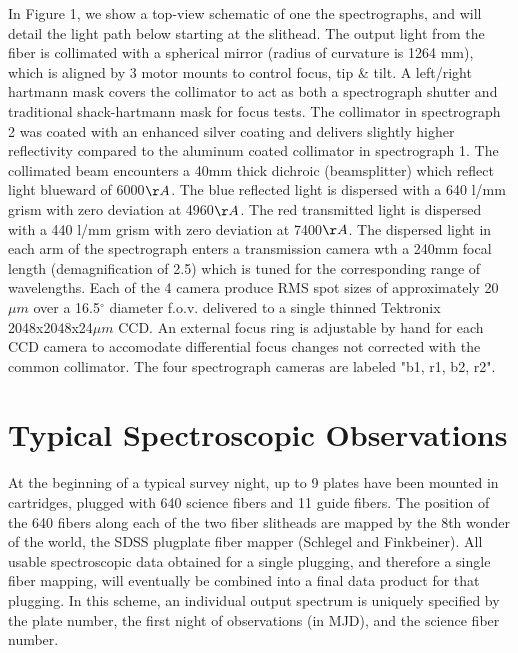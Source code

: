 \documentclass[12pt,preprint]{aastex}
\newcommand{\degree}{^\circ}
\begin{document}
In Figure 1, we show a top-view schematic of one the spectrographs, and
will detail the light path below starting at the slithead.
The output light from the fiber is collimated with a spherical mirror
(radius of curvature is 1264 mm), which is aligned by 3 motor mounts to
control focus, tip \& tilt.  A left/right hartmann mask 
covers the collimator to act as both a spectrograph shutter and traditional 
shack-hartmann mask for focus tests.  The collimator in spectrograph 2
was coated with an enhanced silver coating and delivers slightly higher
reflectivity compared to the aluminum coated collimator in spectrograph 1.
The collimated beam encounters a 40mm thick dichroic (beamsplitter) which
reflect light blueward of 6000$\AA$.  The blue reflected light is dispersed
with a 640 l/mm grism with zero deviation at 4960$\AA$.  The red transmitted
light is dispersed with a 440 l/mm grism with zero deviation at 7400$\AA$.
The dispersed light in each arm of the spectrograph enters a transmission camera
wth a 240mm focal length (demagnification of 2.5) which is tuned for the 
corresponding range of wavelengths.  Each of the 4 camera produce RMS 
spot sizes of approximately 20$\mu m$ over a 16.5$\degree$ diameter 
f.o.v. delivered to a single thinned Tektronix 2048x2048x24$\mu m$ CCD.
An external focus ring is adjustable by hand for each CCD camera to accomodate
differential focus changes not corrected with the common collimator.
The four spectrograph cameras are labeled "b1, r1, b2, r2".  


\section{Typical Spectroscopic Observations}
\label{sec_observ}

At the beginning of a typical survey night, up to 9 plates have been mounted
in cartridges, plugged with 640 science fibers and 11 guide fibers. 
The position of the 640 fibers along each of the two fiber slitheads
are mapped by the 8th wonder of the world,
the SDSS plugplate fiber mapper (Schlegel and Finkbeiner).
All usable spectroscopic data obtained for a single plugging, 
and therefore a single fiber mapping, will eventually be combined into 
a final data product for that plugging.  In this scheme, an individual 
output spectrum is uniquely specified by the plate number, the first night
of observations (in MJD), and the science fiber number.
\end{document}
